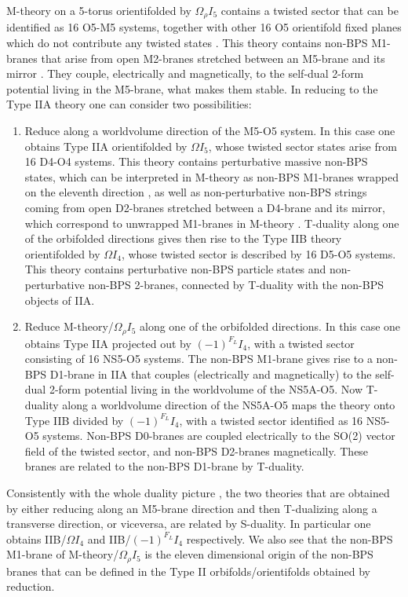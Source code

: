 \documentclass[12pt,a4paper]{article}
\begin{document}
M-theory on a 5-torus orientifolded by $\Omega_\rho I_5$ contains 
a twisted sector that can be identified 
as 16 O5-M5 systems, together with other 16 O5 orientifold fixed planes
which do not contribute any twisted states \cite{W}.
This theory contains non-BPS M1-branes that arise from open
M2-branes stretched between an M5-brane and its mirror \cite{Sen*}. 
They couple,
electrically and magnetically, to the self-dual 2-form potential
living in the M5-brane, what makes them stable.
In reducing to the Type IIA theory one can consider two
possibilities: 

\begin{enumerate}

\item Reduce along a worldvolume direction of the M5-O5 system. 
In this case one obtains Type IIA 
orientifolded by $\Omega I_5$, whose twisted sector states arise from
16 D4-O4 systems. This theory contains perturbative massive non-BPS 
states, which can be interpreted in M-theory as non-BPS 
M1-branes wrapped on the eleventh direction \cite{Sen*}, 
as well as non-perturbative
non-BPS strings coming from open D2-branes stretched between a D4-brane
and its mirror, which correspond to unwrapped M1-branes in M-theory
\cite{Senrev}. T-duality along one of
the orbifolded directions gives then
rise to the Type IIB theory orientifolded by $\Omega I_4$, whose twisted
sector is described by 16 D5-O5 systems. This theory contains 
perturbative non-BPS particle states and non-perturbative non-BPS 2-branes, 
connected by T-duality with the non-BPS objects of IIA.


\item Reduce M-theory/$\Omega_\rho I_5$ along
one of the orbifolded directions. In this case one obtains 
Type IIA projected out by $(-1)^{F_L}I_4$, with a twisted sector
consisting of 16 NS5-O5 systems.
The non-BPS M1-brane gives rise to a non-BPS D1-brane in IIA
that couples (electrically and magnetically) to the self-dual
2-form potential living in the worldvolume of the NS5A-O5. 
Now T-duality along a worldvolume direction of the NS5A-O5 maps
the theory onto Type IIB divided by $(-1)^{F_L}I_4$, with a twisted sector
identified as 16 NS5-O5 systems.  
Non-BPS D0-branes are coupled electrically to the SO(2) vector field of
the twisted sector, and non-BPS D2-branes
magnetically. These branes are related
to the non-BPS D1-brane by T-duality.

\end{enumerate}

\noindent Consistently with the whole duality picture \cite{HW}, 
the two theories that are obtained by either reducing along an
M5-brane direction and then T-dualizing along a transverse direction,
or viceversa, are related by S-duality. In particular one obtains
IIB/$\Omega I_4$ and IIB/$(-1)^{F_L}I_4$ respectively.
We also see that the non-BPS M1-brane of M-theory/$\Omega_\rho I_5$
is the eleven dimensional origin of the non-BPS branes that can be
defined in the
Type II orbifolds/orientifolds obtained by reduction.
\end{document}
